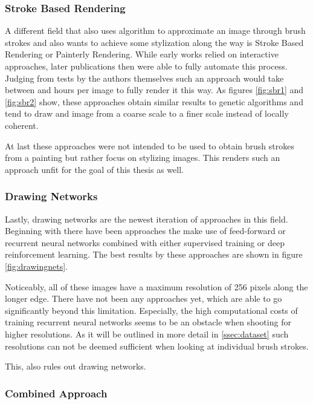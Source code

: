 \subsubsection{Stroke Based Rendering}
A different field that also uses algorithm to approximate an image through brush strokes
and also wants to achieve some stylization along the way is Stroke Based Rendering
or Painterly Rendering.
While early works relied on interactive approaches, later publications then were able
to fully automate this process.
Judging from tests by the authors themselves such an approach would take between 
and  hours per image to fully render it this way.
As figures \ref{fig:sbr1} and \ref{fig:sbr2} show, these approaches obtain similar
results to genetic algorithms and tend to draw and image from a coarse scale to a finer scale
instead of locally coherent.

At last these approaches were not intended to be used to obtain brush strokes from
a painting but rather focus on stylizing images.
This renders such an approach unfit for the goal of this thesis as well.

\subsubsection{Drawing Networks}
Lastly, drawing networks are the newest iteration of approaches in this field.
Beginning with  there have been approaches the make use
of feed-forward or recurrent neural networks combined with either supervised training
or deep reinforcement learning.
The best results by these approaches are shown in figure \ref{fig:drawingnets}.

Noticeably, all of these images have a maximum resolution of 256 pixels along the
longer edge.
There have not been any approaches yet, which are able to go significantly beyond
this limitation.
Especially, the high computational costs of training recurrent neural networks seems
to be an obstacle when shooting for higher resolutions.
As it will be outlined in more detail in \ref{ssec:dataset} such resolutions can not
be deemed sufficient when looking at individual brush strokes.

This, also rules out drawing networks.

\subsubsection{Combined Approach}

